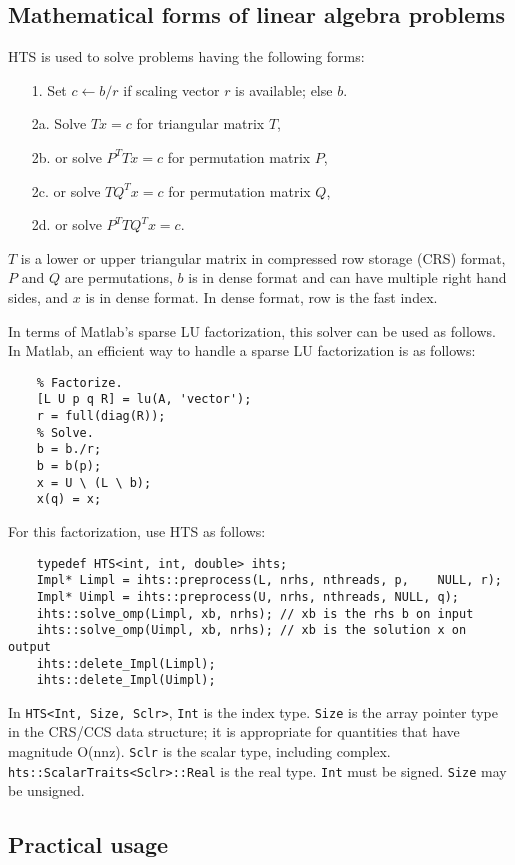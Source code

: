 \subsection{Mathematical forms of linear algebra problems}
HTS is used to solve problems having the following forms:
\begin{enumerate}
\item[1.] Set $c \gets b/r$ if scaling vector $r$ is available; else $b$.
\item[2a.] Solve $T x = c$ for triangular matrix $T$,
\item[2b.] or solve $P^T T x = c$ for permutation matrix $P$,
\item[2c.] or solve $T Q^T x = c$ for permutation matrix $Q$,
\item[2d.] or solve $P^T T Q^T x = c$.
\end{enumerate}
$T$ is a lower or upper triangular matrix in compressed row storage (CRS)
format, $P$ and $Q$ are permutations, $b$ is in dense format and can have
multiple right hand sides, and $x$ is in dense format.
In dense format, row is the fast index.

In terms of Matlab's sparse LU factorization, this solver can be used as
follows. In Matlab, an efficient way to handle a sparse LU factorization is as
follows:
\begin{verbatim}
    % Factorize.
    [L U p q R] = lu(A, 'vector');
    r = full(diag(R));
    % Solve.
    b = b./r;
    b = b(p);
    x = U \ (L \ b);
    x(q) = x;
\end{verbatim}
For this factorization, use HTS as follows:
\begin{verbatim}
    typedef HTS<int, int, double> ihts;
    Impl* Limpl = ihts::preprocess(L, nrhs, nthreads, p,    NULL, r);
    Impl* Uimpl = ihts::preprocess(U, nrhs, nthreads, NULL, q);
    ihts::solve_omp(Limpl, xb, nrhs); // xb is the rhs b on input
    ihts::solve_omp(Uimpl, xb, nrhs); // xb is the solution x on output
    ihts::delete_Impl(Limpl);
    ihts::delete_Impl(Uimpl);
\end{verbatim}
In {\tt HTS<Int, Size, Sclr>},
{\tt Int} is the index type. {\tt Size} is the array pointer type in the CRS/CCS data
structure; it is appropriate for quantities that have magnitude
O(nnz). {\tt Sclr} is the scalar type, including
complex. {\tt hts::ScalarTraits<Sclr>::Real} is the real type. {\tt Int} must be
signed. {\tt Size} may be unsigned.

\subsection{Practical usage}

